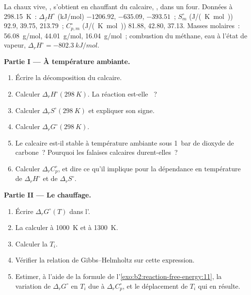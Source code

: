 \begin{problem}
\label{pb:b2:reaction-free-energy:1}
La chaux vive, , s'obtient en chauffant du calcaire, , dans un four. Données à
\qty{298.15}{K}~: $\Delta_f H^\circ$ (\unit{kJ/mol}) 
$-1206.92$,  $-635.09$,  $-393.51$~; $S^\circ_m$
(\unit{J/(K.mol)}) 92.9, 39.75, 213.79~; $C^\circ_{p,m}$ (\unit{J/(K.mol)})
81.88, 42.80, 37.13. Masses molaires~:  \qty{56.08}{g/mol}, 
\qty{44.01}{g/mol},  \qty{16.04}{g/mol}~; combustion du méthane,
eau à l'état de vapeur, $\Delta_r H^\circ = \qty{-802.3}{kJ/mol}$.

\medskip
\noindent\textbf{Partie I --- À température ambiante.}
\begin{enumerate}
  \item Écrire la décomposition du calcaire.
  \item Calculer $\Delta_r H^\circ(\qty{298}{K})$. La réaction est-elle ~?
  \item Calculer $\Delta_r S^\circ(\qty{298}{K})$ et expliquer son signe.
  \item Calculer $\Delta_r G^\circ(\qty{298}{K})$.
  \item Le calcaire est-il stable à température ambiante sous \qty{1}{bar} de
        dioxyde de carbone~? Pourquoi les falaises calcaires durent-elles~?
  \item Calculer $\Delta_r C^\circ_p$, et dire ce qu'il implique pour la
        dépendance en température de $\Delta_r H^\circ$ et de $\Delta_r S^\circ$.
\end{enumerate}

\medskip
\noindent\textbf{Partie II --- Le chauffage.}
\begin{enumerate}[resume]
  \item Écrire $\Delta_r G^\circ(T)$ dans l'.
  \item La calculer à \qty{1000}{K} et à \qty{1300}{K}.
  \item Calculer la  $T_i$.
  \item Vérifier la relation de Gibbs--Helmholtz sur cette expression.
  \item Estimer, à l'aide de la formule de l'\cref{exo:b2:reaction-free-energy:11},
        la variation de $\Delta_r G^\circ$ en $T_i$ due à
        $\Delta_r C^\circ_p$, et le déplacement de $T_i$ qui en résulte.
\end{enumerate}


\end{problem}
